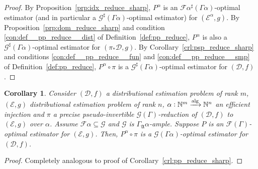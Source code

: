 \documentclass{article}
\numberwithin{equation}{section}
\theoremstyle{definition}
\theoremstyle{plain}
\newtheorem{corollary}{Corollary}[section]
\newcommand{\Nats}{\mathbb{N}}
\newcommand{\Dist}{\mathcal{D}}
\newcommand{\GrowA}{\Gamma_{\mathfrak{A}}}
\newcommand{\Fall}{\mathcal{F}}
\newcommand{\EG}{\Fall(\Gamma)}
\newcommand{\Alg}{\xrightarrow{\textnormal{alg}}}
\begin{document}
\begin{proof}

By Proposition~\ref{prp:idx_reduce_sharp}, ${P^\alpha}$ is an ${\Fall \alpha^\sharp(\Gamma \alpha)}$-optimal estimator (and in particular a ${\mathcal{G}^\sharp (\Gamma \alpha)}$-optimal estimator) for ${(\mathcal{E}^\alpha, g)}$. By Proposition~\ref{prp:dom_reduce_sharp} and condition \ref{con:def__pp_reduce__dist} of Definition~\ref{def:pp_reduce}, ${P^\alpha}$ is also a ${\mathcal{G}^\sharp (\Gamma \alpha)}$-optimal estimator for ${(\pi_* \Dist, g)}$. By Corollary~\ref{crl:psp_reduce_sharp} and conditions \ref{con:def__pp_reduce__fun} and \ref{con:def__pp_reduce__smp} of Definition~\ref{def:pp_reduce}, ${P^\alpha \circ \pi}$ is a ${\mathcal{G}^\sharp (\Gamma \alpha)}$-optimal estimator for ${(\Dist, f)}$.
%
\end{proof}

\begin{samepage}
\begin{corollary}

Consider $(\Dist,f)$ a distributional estimation problem of rank ${m}$, $(\mathcal{E},g)$ distributional estimation problem of rank ${n}$, ${\alpha: \Nats^m \Alg \Nats^n}$ an efficient injection and $\pi$ a precise pseudo-invertible $\mathcal{G}(\Gamma)$-reduction of $(\Dist, f)$ to $(\mathcal{E}, g)$ over ${\alpha}$. Assume ${\Fall\alpha \subseteq \mathcal{G}}$ and ${\mathcal{G}}$ is ${\GrowA \alpha}$-ample. Suppose $P$ is an $\EG$-optimal estimator for $(\mathcal{E}, g)$. Then, $P^\alpha \circ \pi$ is a $\mathcal{G} (\Gamma \alpha)$-optimal estimator for $(\Dist, f)$.

\end{corollary}
\end{samepage}

\begin{proof}

Completely analogous to proof of Corollary~\ref{crl:pp_reduce_sharp}.
%
\end{proof}
\end{document}
